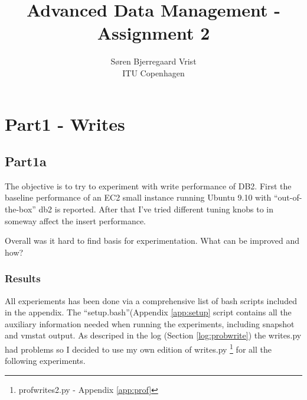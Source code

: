 
\title{Advanced Data Management - Assignment 2}
\author{S\o ren Bjerregaard Vrist\\ITU Copenhagen}


\maketitle

\chapter{Part1 - Writes}
\section{Part1a}
The objective is to try to experiment with write performance of DB2. 
First the baseline performance of an EC2 small instance running Ubuntu 9.10 with
``out-of-the-box'' db2 is reported. After that I've tried different tuning knobs
to in someway affect the insert performance.

Overall was it hard to find basis for experimentation. What can be improved and
how? 

\subsection{Results}
All experiements has been done via a comprehensive list of bash scripts included
in the appendix. The ``setup.bash''(Appendix \ref{app:setup} script contains all the auxiliary
information needed when running the experiments, including snapshot and vmstat
output. As descriped in the log (Section \ref{log:probwrite}) the writes.py had
problems so I decided to use my own edition of writes.py \footnote{profwrites2.py -
Appendix \ref{app:prof}} for all the following experiments.


